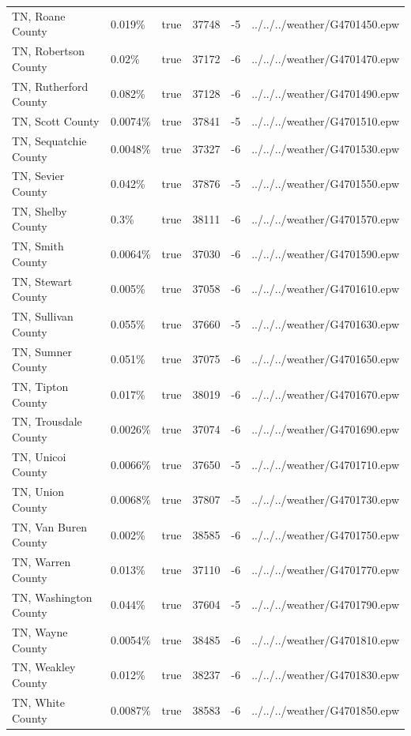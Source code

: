 \begin{longtable}[]{@{}llllll@{}}
TN, Roane County & 0.019\% & true & 37748 & -5 &
../../../weather/G4701450.epw \\
TN, Robertson County & 0.02\% & true & 37172 & -6 &
../../../weather/G4701470.epw \\
TN, Rutherford County & 0.082\% & true & 37128 & -6 &
../../../weather/G4701490.epw \\
TN, Scott County & 0.0074\% & true & 37841 & -5 &
../../../weather/G4701510.epw \\
TN, Sequatchie County & 0.0048\% & true & 37327 & -6 &
../../../weather/G4701530.epw \\
TN, Sevier County & 0.042\% & true & 37876 & -5 &
../../../weather/G4701550.epw \\
TN, Shelby County & 0.3\% & true & 38111 & -6 &
../../../weather/G4701570.epw \\
TN, Smith County & 0.0064\% & true & 37030 & -6 &
../../../weather/G4701590.epw \\
TN, Stewart County & 0.005\% & true & 37058 & -6 &
../../../weather/G4701610.epw \\
TN, Sullivan County & 0.055\% & true & 37660 & -5 &
../../../weather/G4701630.epw \\
TN, Sumner County & 0.051\% & true & 37075 & -6 &
../../../weather/G4701650.epw \\
TN, Tipton County & 0.017\% & true & 38019 & -6 &
../../../weather/G4701670.epw \\
TN, Trousdale County & 0.0026\% & true & 37074 & -6 &
../../../weather/G4701690.epw \\
TN, Unicoi County & 0.0066\% & true & 37650 & -5 &
../../../weather/G4701710.epw \\
TN, Union County & 0.0068\% & true & 37807 & -5 &
../../../weather/G4701730.epw \\
TN, Van Buren County & 0.002\% & true & 38585 & -6 &
../../../weather/G4701750.epw \\
TN, Warren County & 0.013\% & true & 37110 & -6 &
../../../weather/G4701770.epw \\
TN, Washington County & 0.044\% & true & 37604 & -5 &
../../../weather/G4701790.epw \\
TN, Wayne County & 0.0054\% & true & 38485 & -6 &
../../../weather/G4701810.epw \\
TN, Weakley County & 0.012\% & true & 38237 & -6 &
../../../weather/G4701830.epw \\
TN, White County & 0.0087\% & true & 38583 & -6 &
../../../weather/G4701850.epw \\

\end{longtable}
